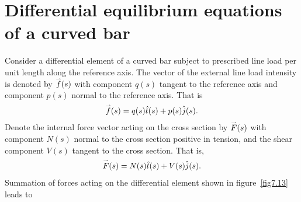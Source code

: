 \documentclass{AeroStructure-ERJohnson}
\def\harp#1{\smash{\mathord{\buildrel{\lower3pt\hbox{$\scriptscriptstyle\rightharpoonup$}}\over{#1}}}}
\begin{document}
\pagebreak

\section{Differential equilibrium equations of a curved bar}\label{sec7.3}

Consider a differential element of a curved bar subject to prescribed line load per unit length along the reference axis. The vector of the external line load intensity is denoted by $\harp{f}(s)$ with component $q(s)$ tangent to the reference axis and component $p(s)$ normal to the reference axis. That is
\begin{align}\label{eq7.30}
\harp{f}(s)=q(s) \hat{t}(s)+p(s) \hat{j}(s).
\end{align}
Denote the internal force vector acting on the cross section by $\harp{F}(s)$ with component $N(s)$ normal to the cross section positive in tension, and the shear component $V(s)$ tangent to the cross section. That is,
\begin{align}\label{eq7.31}
\harp{F}(s)=N(s) \hat{t}(s)+V(s) \hat{j}(s).
\end{align}
Summation of forces acting on the differential element shown in figure~\ref{fig7.13} leads to
{\def\thefigure{7.13}
}
\vspace*{-2\baselineskip}
\end{document}

